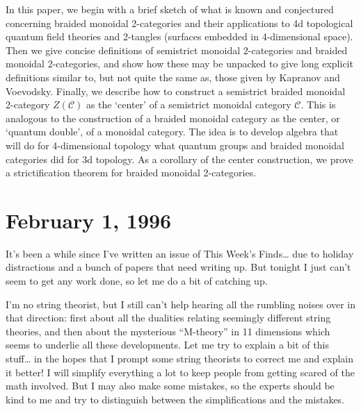 \documentclass{article}
\def\tightlist{}
\renewcommand{\texttt}[1]{%
  \begingroup
  \ttfamily
  \begingroup\lccode`~=`/\lowercase{\endgroup\def~}{/\discretionary{}{}{}}%
  \begingroup\lccode`~=`[\lowercase{\endgroup\def~}{[\discretionary{}{}{}}%
  \begingroup\lccode`~=`.\lowercase{\endgroup\def~}{.\discretionary{}{}{}}%
  \catcode`/=\active\catcode`[=\active\catcode`.=\active
  \scantokens{#1\noexpand}%
  \endgroup
}
\begin{document}

In this paper, we begin with a brief sketch of what is known and
conjectured concerning braided monoidal 2-categories and their
applications to 4d topological quantum field theories and 2-tangles
(surfaces embedded in 4-dimensional space). Then we give concise
definitions of semistrict monoidal 2-categories and braided monoidal
2-categories, and show how these may be unpacked to give long explicit
definitions similar to, but not quite the same as, those given by
Kapranov and Voevodsky. Finally, we describe how to construct a
semistrict braided monoidal 2-category \(Z(\mathcal{C})\) as the
`center' of a semistrict monoidal category \(\mathcal{C}\). This is
analogous to the construction of a braided monoidal category as the
center, or `quantum double', of a monoidal category. The idea is to
develop algebra that will do for 4-dimensional topology what quantum
groups and braided monoidal categories did for 3d topology. As a
corollary of the center construction, we prove a strictification theorem
for braided monoidal 2-categories.
\hypertarget{week72}{%
\section{February 1, 1996}\label{week72}}

It's been a while since I've written an issue of This Week's
Finds\ldots{} due to holiday distractions and a bunch of papers that
need writing up. But tonight I just can't seem to get any work done, so
let me do a bit of catching up.

I'm no string theorist, but I still can't help hearing all the rumbling
noises over in that direction: first about all the dualities relating
seemingly different string theories, and then about the mysterious
``M-theory'' in 11 dimensions which seems to underlie all these
developments. Let me try to explain a bit of this stuff\ldots{} in the
hopes that I prompt some string theorists to correct me and explain it
better! I will simplify everything a lot to keep people from getting
scared of the math involved. But I may also make some mistakes, so the
experts should be kind to me and try to distinguish between the
simplifications and the mistakes.
\end{document}
